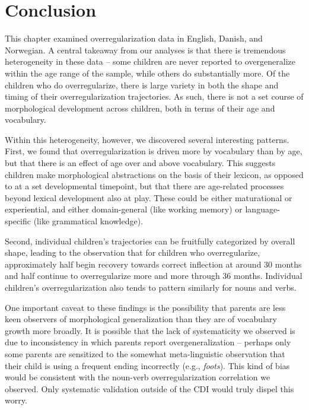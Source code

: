 \documentclass[
   11pt,
       ]{book}
\begin{document}
\hypertarget{cdi-overreg-conclusion}{%
\section{Conclusion}\label{cdi-overreg-conclusion}}

This chapter examined overregularization data in English, Danish, and Norwegian. A central takeaway from our analyses is that there is tremendous heterogeneity in these data -- some children are never reported to overgeneralize within the age range of the sample, while others do substantially more. Of the children who do overregularize, there is large variety in both the shape and timing of their overregularization trajectories. As such, there is not a set course of morphological development across children, both in terms of their age and vocabulary.

Within this heterogeneity, however, we discovered several interesting patterns.
First, we found that overregularization is driven more by vocabulary than by age, but that there is an effect of age over and above vocabulary. This suggests children make morphological abstractions on the basis of their lexicon, as opposed to at a set developmental timepoint, but that there are age-related processes beyond lexical development also at play. These could be either maturational or experiential, and either domain-general (like working memory) or language-specific (like grammatical knowledge).

Second, individual children's trajectories can be fruitfully categorized by overall shape, leading to the observation that for children who overregularize, approximately half begin recovery towards correct inflection at around 30 months and half continue to overregularize more and more through 36 months. Individual children's overregularization also tends to pattern similarly for nouns and verbs.

One important caveat to these findings is the possibility that parents are less keen observers of morphological generalization than they are of vocabulary growth more broadly. It is possible that the lack of systematicity we observed is due to inconsistency in which parents report overgeneralization -- perhaps only some parents are sensitized to the somewhat meta-linguistic observation that their child is using a frequent ending incorrectly (e.g., \emph{foots}). This kind of bias would be consistent with the noun-verb overregularization correlation we observed. Only systematic validation outside of the CDI would truly dispel this worry.
\end{document}
